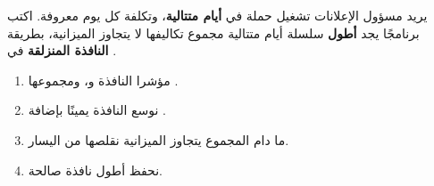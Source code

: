 \begin{statement}
يريد مسؤول الإعلانات تشغيل حملة في \textbf{أيام متتالية}، وتكلفة كل يوم معروفة. اكتب برنامجًا يجد \textbf{أطول} سلسلة أيام متتالية مجموع تكاليفها لا يتجاوز الميزانية، بطريقة \textbf{النافذة المنزلقة} في .
\end{statement}
\begin{stepsbox}\begin{enumerate}
\item مؤشرا النافذة  و، ومجموعها .
\item نوسع النافذة يمينًا بإضافة .
\item ما دام المجموع يتجاوز الميزانية نقلصها من اليسار.
\item نحفظ أطول نافذة صالحة.
\end{enumerate}\end{stepsbox}
